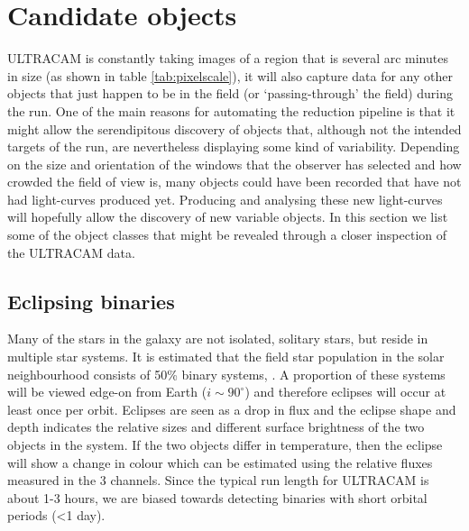 \section{Candidate objects}
ULTRACAM is constantly taking images of a region that is several arc minutes in size (as shown in table \ref{tab:pixelscale}), it will also capture data for any other objects that just happen to be in the field (or `passing-through' the field) during the run. One of the main reasons for automating the reduction pipeline is that it  might allow the serendipitous discovery of objects that, although not the intended targets of the run, are nevertheless displaying some kind of variability. Depending on the size and orientation of the windows that the observer has selected and how crowded the field of view is, many objects could have been recorded that have not had light-curves produced yet. Producing and analysing these new light-curves will hopefully allow the discovery of new variable objects.  In this section we list some of the object classes that might be revealed through a closer inspection of the ULTRACAM data.

\subsection{Eclipsing binaries}
Many of the stars in the galaxy are not isolated, solitary stars, but reside in multiple star systems. It is estimated that the field star population in the solar neighbourhood consists of 50\% binary systems, \citep{binaryfraction}. A proportion of these systems will be viewed edge-on from Earth ($i \sim 90^\circ$) and therefore eclipses will occur at least once per orbit. Eclipses are seen as a drop in flux and the eclipse shape and depth indicates the relative sizes and different surface brightness of the two objects in the system. If the two objects differ in temperature, then the eclipse will show a change in colour which can be estimated using the relative fluxes measured in the 3 channels. Since the typical run length for ULTRACAM is about 1-3 hours, we are biased towards detecting binaries with short orbital periods (\textless 1 day). 

